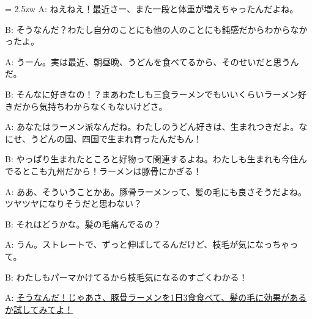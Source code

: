 \documentclass[11pt]{amsart}
\title{}
\author{}
\newenvironment{hangall}[1]{\hangindent = 2.5zw\everypar{\hangindent = 2.5zw}}{}
\begin{document}
\maketitle
\begin{hangall}{}%
A: ねえねえ！最近さー、また一段と体重が増えちゃったんだよね。

B: そうなんだ？わたし自分のことにも他の人のことにも鈍感だからわからなかったよ。

A: うーん。実は最近、朝昼晩、うどんを食べてるから、そのせいだと思うんだ。

B: そんなに好きなの！？まあわたしも三食ラーメンでもいいくらいラーメン好きだから気持ちわからなくもないけどさ。

A: あなたはラーメン派なんだね。わたしのうどん好きは、生まれつきだよ。なにせ、うどんの国、四国で生まれ育ったんだもん！

B: やっぱり生まれたところと好物って関連するよね。わたしも生まれも今住んでるとこも九州だから！ラーメンは豚骨にかぎる！

A: ああ、そういうことかあ。豚骨ラーメンって、髪の毛にも良さそうだよね。ツヤツヤになりそうだと思わない？

B: それはどうかな。髪の毛痛んでるの？

A: うん。ストレートで、ずっと伸ばしてるんだけど、枝毛が気になっちゃって。

B: わたしもパーマかけてるから枝毛気になるのすごくわかる！

A: \ul{そうなんだ！じゃあさ、豚骨ラーメンを1日3食食べて、髪の毛に効果があるか試してみてよ！}\end{hangall}
\end{document}
